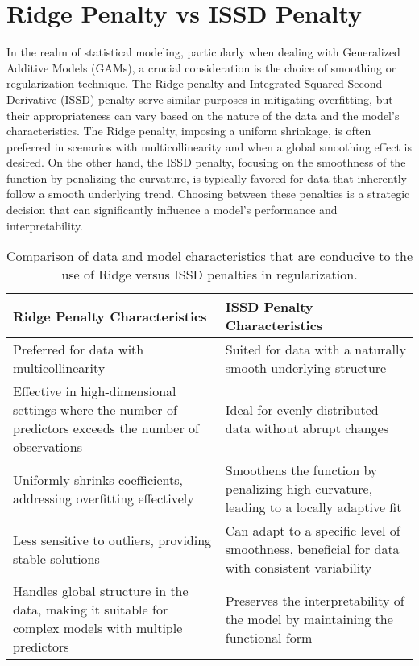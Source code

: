 \documentclass[12pt, twoside,hidelinks]{article}
\theoremstyle{definition}
\numberwithin{equation}{section}
\begin{document}
\section{Ridge Penalty vs ISSD Penalty}

In the realm of statistical modeling, particularly when dealing with Generalized Additive Models (GAMs), a crucial consideration is the choice of smoothing or regularization technique. The Ridge penalty and Integrated Squared Second Derivative (ISSD) penalty serve similar purposes in mitigating overfitting, but their appropriateness can vary based on the nature of the data and the model's characteristics. The Ridge penalty, imposing a uniform shrinkage, is often preferred in scenarios with multicollinearity and when a global smoothing effect is desired. On the other hand, the ISSD penalty, focusing on the smoothness of the function by penalizing the curvature, is typically favored for data that inherently follow a smooth underlying trend. Choosing between these penalties is a strategic decision that can significantly influence a model's performance and interpretability.

\begin{table}[ht]
\centering
\begin{tabular}{p{}p{}}
\hline
\textbf{Ridge Penalty Characteristics} & \textbf{ISSD Penalty Characteristics} \\
\hline
Preferred for data with multicollinearity & Suited for data with a naturally smooth underlying structure \\
Effective in high-dimensional settings where the number of predictors exceeds the number of observations & Ideal for evenly distributed data without abrupt changes \\
Uniformly shrinks coefficients, addressing overfitting effectively & Smoothens the function by penalizing high curvature, leading to a locally adaptive fit \\
Less sensitive to outliers, providing stable solutions & Can adapt to a specific level of smoothness, beneficial for data with consistent variability \\
Handles global structure in the data, making it suitable for complex models with multiple predictors & Preserves the interpretability of the model by maintaining the functional form \\
\hline
\end{tabular}
\caption{Comparison of data and model characteristics that are conducive to the use of Ridge versus ISSD penalties in regularization.}
\label{table:ridge_vs_issd}
\end{table}
\end{document}
